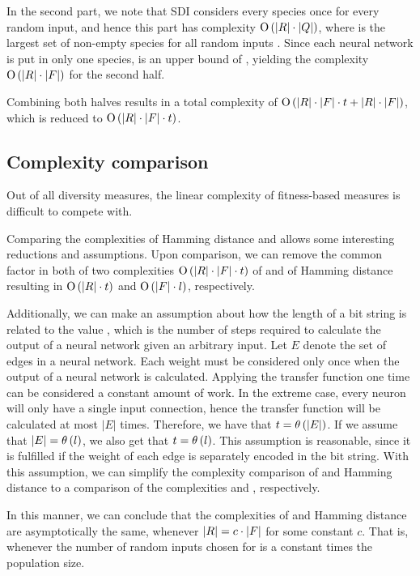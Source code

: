 In the second part, we note that SDI considers every species once for every random input, and hence this part has complexity $\operatorname{O}\left(\lvert R\rvert\cdot\lvert Q\rvert\right)$, where \nemptyspeciesset{} is the largest set of non-empty species for all random inputs \ranset. Since each neural network is put in only one species, \indsetl{} is an upper bound of \nemptyspeciessetl, yielding the complexity $\operatorname{O}\left(\lvert R\rvert\cdot\lvert F\rvert\right)$ for the second half.

Combining both halves results in a total complexity of $\operatorname{O}\left(\lvert R\rvert \cdot \lvert F\rvert \cdot t + \lvert R\rvert \cdot \lvert F\rvert\right)$, which is reduced to $\operatorname{O}\left(\lvert R\rvert\cdot\lvert F\rvert\cdot t\right)$.

\subsection{Complexity comparison}
Out of all diversity measures, the linear complexity of fitness-based measures is difficult to compete with.

Comparing the complexities of Hamming distance and \dia{} allows some interesting reductions and assumptions. Upon comparison, we can remove the common factor \indset{} in both of two complexities $\operatorname{O}\left(\lvert R\rvert\cdot\lvert F\rvert\cdot t\right)$ of \dia{} and \bigO{\indsetl^2 \cdot \bitstringl} of Hamming distance resulting in $\operatorname{O}\left(\lvert R\rvert \cdot t\right)$ and $\operatorname{O}\left(\lvert F\rvert \cdot l\right)$, respectively. 

Additionally, we can make an assumption about how the length of a bit string \bitstringl{} is related to the value \timet, which is the number of steps required to calculate the output of a neural network given an arbitrary input. Let $E$ denote the set of edges in a neural network. Each weight must be considered only once when the output of a neural network is calculated. Applying the transfer function one time can be considered a constant amount of work. In the extreme case, every neuron will only have a single input connection, hence the transfer function will be calculated at most $|E|$ times. Therefore, we have that $t = \theta\left(\lvert E\rvert\right)$. If we assume that $\lvert E\rvert = \theta\left(l\right)$, we also get that $t = \theta\left(l\right)$. This assumption is reasonable, since it is fulfilled if the weight of each edge is separately encoded in the bit string. With this assumption, we can simplify the complexity comparison of \dia{} and Hamming distance to a comparison of the complexities \bigO{\ransetl} and \bigO{\indsetl}, respectively.

In this manner, we can conclude that the complexities of \dia{} and Hamming distance are asymptotically the same, whenever $\lvert R\rvert = c \cdot \lvert F\rvert$ for some constant $c$. That is, whenever the number of random inputs chosen for \dia{} is a constant times the population size.
